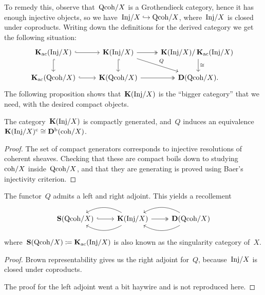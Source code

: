 \documentclass[10pt,a4paper]{article}
\begin{document}
To remedy this, observe that~$\mathrm{Qcoh}/X$ is a Grothendieck category, hence it has enough injective objects, so we have~$\mathrm{Inj}/X\hookrightarrow\mathrm{Qcoh}/X$, where~$\mathrm{Inj}/X$ is closed under coproducts. Writing down the definitions for the derived category we get the following situation:
\begin{equation}
  \begin{tikzcd}
    \KKK_\ac(\Inj/X) \arrow[hook]{r} \arrow[hook]{d} & \KKK(\Inj/X) \arrow[hook]{d} \arrow[two heads]{r} \arrow{rd}{Q} & \KKK(\Inj/X)/\KKK_\ac(\Inj/X) \arrow{d}{\cong} \\
    \KKK_\ac(\Qcoh/X) \arrow[hook]{r} & \KKK(\Qcoh/X) \arrow[two heads]{r} & \derived(\Qcoh/X).
  \end{tikzcd}
\end{equation}
The following proposition shows that~$\operatorname{\mathbf{K}}(\mathrm{Inj}/X)$ is the ``bigger category'' that we need, with the desired compact objects.
\begin{proposition}
  The category~$\operatorname{\mathbf{K}}(\mathrm{Inj}/X)$ is compactly generated, and~$Q$ induces an equivalence~$\operatorname{\mathbf{K}}(\mathrm{Inj}/X)^{\mathrm{c}}\cong\mathbf{D}^{\mathrm{b}}(\mathrm{coh}/X)$.
  \begin{proof}
    The set of compact generators corresponds to injective resolutions of coherent sheaves. Checking that these are compact boils down to studying~$\mathrm{coh}/X$ inside~$\mathrm{Qcoh}/X$, and that they are generating is proved using Baer's injectivity criterion.
  \end{proof}
\end{proposition}
\begin{theorem}
  The functor~$Q$ admits a left and right adjoint. This yields a recollement
  \begin{equation}
    \begin{tikzcd}
      \SSing(\Qcoh/X) \arrow[hook]{r} & \KKK(\Inj/X) \arrow[bend right, swap]{l} \arrow[bend left]{l} \arrow[two heads]{r} & \derived(\Qcoh/X) \arrow[bend right, swap]{l} \arrow[bend left]{l}
    \end{tikzcd}
  \end{equation}
  where~$\operatorname{\mathbf{S}}(\mathrm{Qcoh}/X)\coloneqq\operatorname{\mathbf{K}}_{\mathrm{ac}}(\mathrm{Inj}/X)$ is also known as the singularity category of~$X$.

  \begin{proof}
    Brown representability gives us the right adjoint for~$Q$, because~$\mathrm{Inj}/X$ is closed under coproducts.

    The proof for the left adjoint went a bit haywire and is not reproduced here.
  \end{proof}
\end{theorem}
\end{document}
